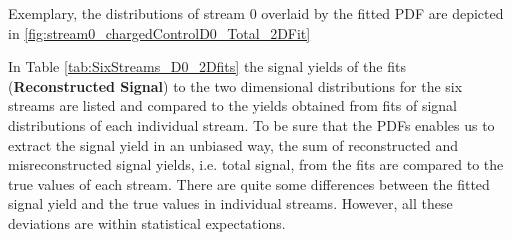 Exemplary, the distributions of stream 0 overlaid by the fitted PDF are depicted in \cref{fig:stream0_chargedControlD0_Total_2DFit} %
           
           In Table \ref{tab:SixStreams_D0_2Dfits} the signal yields of the fits (\textbf{Reconstructed Signal}) to the two dimensional distributions for the six streams 
           are listed and compared to the yields obtained from fits of signal distributions of each individual stream. 
           To be sure that the PDFs enables us to extract the signal yield in an unbiased way, the sum of reconstructed and misreconstructed signal yields, 
           i.e. total signal, from the fits are compared to the true values of each stream.
           There are quite some differences between the fitted signal yield and the true values in individual streams. However,  all these deviations are within statistical expectations. \\
           
